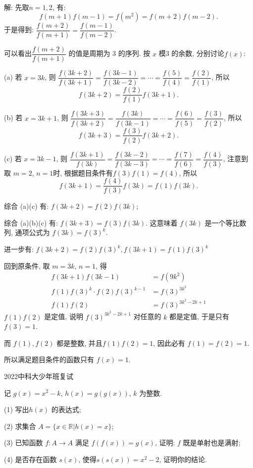 ~

解: 先取$n=1,2$, 有:
\[ f(m+1)f(m-1) = f(m^2) = f(m+2)f(m-2) .\]
于是得到: $\dfrac{f(m+2)}{f(m+1)} = \dfrac{f(m-1)}{f(m-2)}$. 

可以看出$\dfrac{f(m+2)}{f(m+1)}$ 的值是周期为 3 的序列. 按 $x$ 模3 的余数, 分别讨论$f(x)$:

(a) 若 $x=3k$, 则 $\dfrac{f(3k+2)}{f(3k+1)} = \dfrac{f(3k-1)}{f(3k-2)} = \cdots = \dfrac{f(5)}{f(4)} = \dfrac{f(2)}{f(1)}$, 所以
\[f(3k+2) = \dfrac{f(2)}{f(1)}f(3k+1) .\]

(b) 若 $x=3k+1$, 则 $\dfrac{f(3k+3)}{f(3k+2)} = \dfrac{f(3k)}{f(3k-1)} = \cdots = \dfrac{f(6)}{f(5)} = \dfrac{f(3)}{f(2)}$, 所以
\[f(3k+3) = \dfrac{f(3)}{f(2)}f(3k+2) .\]

(c) 若 $x=3k-1$, 则 $\dfrac{f(3k+1)}{f(3k)} = \dfrac{f(3k-2)}{f(3k-3)} = \cdots = \dfrac{f(7)}{f(6)} = \dfrac{f(4)}{f(3)}$, 注意到取 $m=2$, $n=1$时, 根据题目条件有$f(3)f(1)=f(4)$, 所以
\[f(3k+1) = \dfrac{f(4)}{f(3)}f(3k) = f(1)f(3k) .\]

综合 (a)(c) 有: $f(3k+2)=f(2)f(3k)$; 

综合 (a)(b)(c) 有: $f(3k+3) = f(3)f(3k)$. 这意味着 $f(3k)$ 是一个等比数列, 通项公式为 $f(3k)=f(3)^k$.

进一步有: $f(3k+2)=f(2)f(3)^k, f(3k+1) = f(1)f(3)^k$

回到原条件, 取 $m=3k$, $n=1$, 得 
\begin{align*}
f(3k+1)f(3k-1) &=f(9k^2) \\
f(1)f(3)^k \cdot f(2)f(3)^{k-1} &= f(3)^{3k^2}\\
f(1)f(2) &= f(3)^{3k^2-2k+1}
\end{align*} 
$f(1)f(2)$ 是定值, 说明 $f(3)^{3k^2-2k+1}$ 对任意的 $k$ 都是定值, 于是只有 $f(3)=1$. 

而 $f(1), f(2)$ 都是整数, 并且$f(1)f(2)=1$, 因此必有 $f(1)=f(2)=1$.

所以满足题目条件的函数只有 $f(x)=1$.


\newpage
\noindent 2022中科大少年班复试

记 $g(x)=x^2-k$, $h(x)=g(g(x))$, $k$ 为整数.

(1) 写出$h(x)$ 的表达式;

(2) 求集合 $A=\{ x\in \mathbb{R} | h(x) = x\}$;

(3) 已知函数 $f: A\rightarrow A$ 满足 $f(f(x)) = g(x)$, 证明: $f$ 既是单射也是满射;

(4) 是否存在函数 $s(x)$, 使得$s(s(x))=x^2-2$, 证明你的结论.

